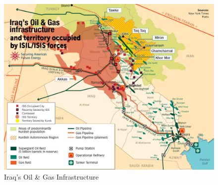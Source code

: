 \documentclass{report}
\begin{document}
\begin{figure}[H]
 \centering
 \includegraphics[trim = 0cm 0cm 0cm 0cm, clip,scale=0.3]{./figures/oil_infrastructure.jpg}
   \caption{Iraq's Oil \& Gas Infrastructure \cite{EnergyPolicyInformationCenter2014}}
     \label{fig:oil_infrastructure}
\end{figure}
\end{document}
